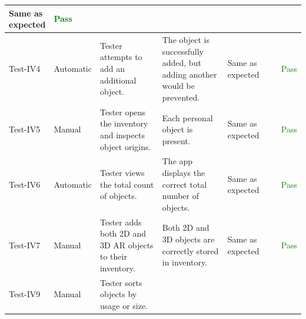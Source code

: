 \documentclass[12pt, titlepage]{article}
\begin{document}
\begin{table}[H]
{\begin{tabular}{|l|p{0.15\linewidth}|p{0.3\linewidth}|p{0.3\linewidth}|p{0.3\linewidth}|p{0.1\linewidth}|}
      Same as expected                                                         &
      \textcolor{Green}{Pass}                                                    \\
      \hline
      Test-IV4                                                                 &
      Automatic                                                                &
      Tester attempts to add an additional object.                             &
      The object is successfully added, but adding another would be prevented. &
      Same as expected                                                         &
      \textcolor{Green}{Pass}                                                    \\
      \hline
      Test-IV5                                                                 &
      Manual                                                                   &
      Tester opens the inventory and inspects object origins.                  &
      Each personal object is present.                                         &
      Same as expected                                                         &
      \textcolor{Green}{Pass}                                                    \\
      \hline
      Test-IV6                                                                 &
      Automatic                                                                &
      Tester views the total count of objects.                                 &
      The app displays the correct total number of objects.                    &
      Same as expected                                                         &
      \textcolor{Green}{Pass}                                                    \\
      \hline
      Test-IV7                                                                 &
      Manual                                                                   &
      Tester adds both 2D and 3D AR objects to their inventory.                &
      Both 2D and 3D objects are correctly stored in inventory.                &
      Same as expected                                                         &
      \textcolor{Green}{Pass}                                                    \\
      \hline
      Test-IV9                                                                 &
      Manual                                                                   &
      Tester sorts objects by usage or size.                                   &

\end{tabular}}
\end{table}
\end{document}
